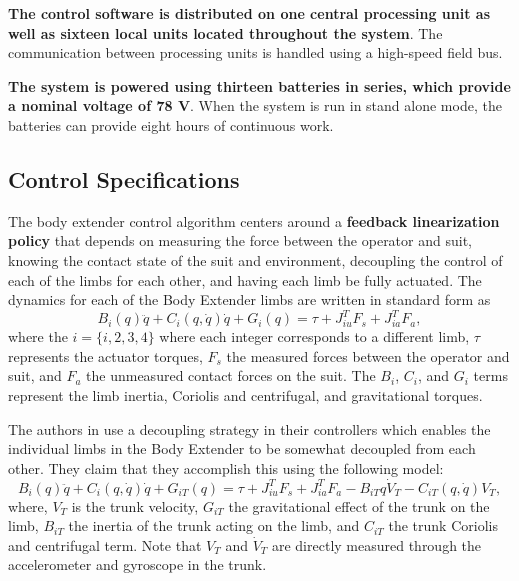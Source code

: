 {\bf The control software is distributed on one central processing unit as well as sixteen local units located throughout the system}.  The communication between processing units is handled using a high-speed field bus.
 
{\bf The system is powered using thirteen batteries in series, which provide a nominal voltage of 78 V}.  When the system is run in stand alone mode, the batteries can provide eight hours of continuous work.
 
 
 \subsection{Control Specifications}
 
 The body extender control algorithm centers around a {\bf feedback linearization policy} that depends on measuring the force between the operator and suit, knowing the contact state of the suit and environment, decoupling the control of each of the limbs for each other, and having each limb be fully actuated.  The dynamics for each of the Body Extender limbs are written in standard form as  
\begin{equation}
B_i(q) \ddot{q} + C_i(q,\dot{q})\dot{q} + G_i(q) = \tau + J^T_{iu}F_s + J^T_{ia}F_a,
\end{equation}
where the $i = \{ i,2,3,4\}$ where each integer corresponds to a different limb, $\tau$ represents the actuator torques, $F_s$ the measured forces between the operator and suit, and $F_a$ the unmeasured contact forces on the suit.  The $B_i$, $C_i$, and $G_i$ terms represent the limb inertia, Coriolis and centrifugal, and gravitational torques.  

The authors in \cite{} use a decoupling strategy in their controllers which enables the individual limbs in the Body Extender to be somewhat decoupled from each other.  They claim that they accomplish this using the following model:
\begin{equation}
B_i(q) \ddot{q} + C_i(q,\dot{q})\dot{q} + G_{iT}(q) = \tau + J^T_{iu}F_s + J^T_{ia}F_a - B_{iT}{q}\dot{V}_T - C_{iT}(q,\dot{q})V_T,
\end{equation}
where, $V_T$ is the trunk velocity, $G_{iT}$ the gravitational effect of the trunk on the limb, $B_{iT}$ the inertia of the trunk acting on the limb, and $C_{iT}$ the trunk Coriolis and centrifugal term.  Note that $V_T$ and $\dot{V}_T$ are directly measured through the accelerometer and gyroscope in the trunk.

